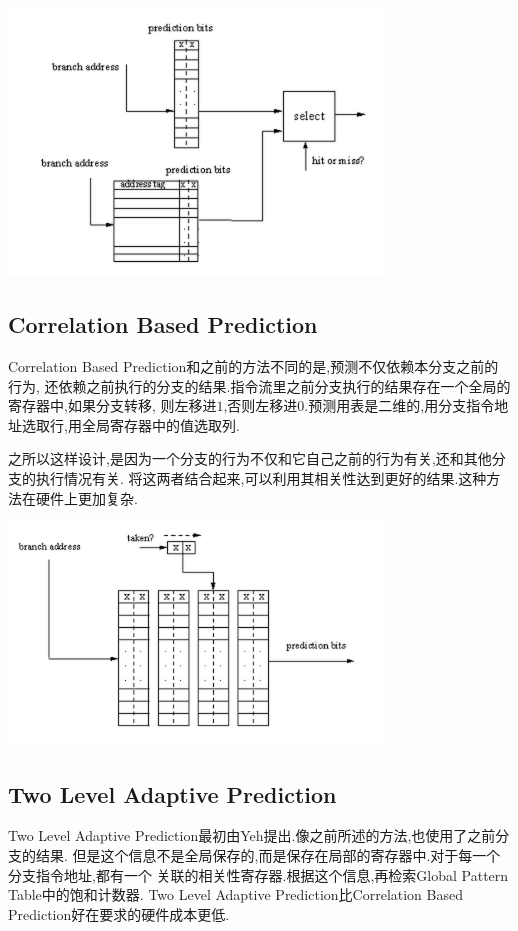 \documentclass[adobefonts, nocap]{ctexart}
\begin{document}
      \begin{center}
        \includegraphics[width=10cm]{6.png}
      \end{center}
    \subsection{Correlation Based Prediction}
      Correlation Based Prediction和之前的方法不同的是,预测不仅依赖本分支之前的行为,
      还依赖之前执行的分支的结果.指令流里之前分支执行的结果存在一个全局的寄存器中,如果分支转移,
      则左移进$1$,否则左移进$0$.预测用表是二维的,用分支指令地址选取行,用全局寄存器中的值选取列.

      之所以这样设计,是因为一个分支的行为不仅和它自己之前的行为有关,还和其他分支的执行情况有关.
      将这两者结合起来,可以利用其相关性达到更好的结果.这种方法在硬件上更加复杂.

      \begin{center}
        \includegraphics[width=10cm]{7.png}
      \end{center}
    \subsection{Two Level Adaptive Prediction}
      Two Level Adaptive Prediction最初由Yeh提出.像之前所述的方法,也使用了之前分支的结果.
      但是这个信息不是全局保存的,而是保存在局部的寄存器中.对于每一个分支指令地址,都有一个
      关联的相关性寄存器.根据这个信息,再检索Global Pattern Table中的饱和计数器. Two Level
      Adaptive Prediction比Correlation Based Prediction好在要求的硬件成本更低.
\end{document}
